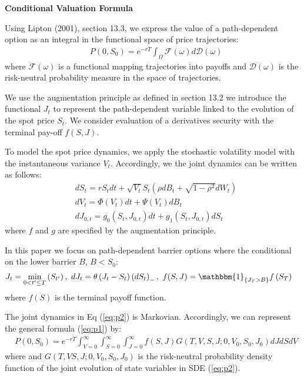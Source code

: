 \documentclass[pdftex,11pt,a4paper] {article}
\begin{document}
\textbf{Conditional Valuation Formula}




Using Lipton (2001), section 13.3, we express the value of a path-dependent option as an integral in the functional space of price trajectories:
\begin{equation} \label {eq:p1}
\begin{split}
& P(0, S_{0}) = e^{-rT} \int_{\Omega}\mathcal{F}(\omega)d\mathcal{D}(\omega)
\end{split}
\end{equation}
where $\mathcal{F}(\omega)$ is a functional mapping trajectories into payoffs and $\mathcal{D}(\omega)$ is the risk-neutral probability measure in the space of trajectories.

We use the augmentation principle as defined in section 13.2 we introduce the functional $J_{t}$  to represent the path-dependent variable linked to the evolution of the spot price $S_{t}$. We consider evaluation of a derivatives security with the terminal pay-off $f(S,J)$.


To model the spot price dynamics, we apply the stochastic volatility model with the instantaneous variance $V_{t}$. Accordingly, we the joint dynamics can be written as follows:
\begin{equation} \label {eq:p2}
\begin{split}
& dS_{t} = rS_{t}dt + \sqrt{V_{t}} S_{t}  \left(\rho dB_{t} + \sqrt{1-\rho^{2}}dW_{t}\right)\\
& dV_{t} = \Phi(V_{t})dt + \Psi(V_{t})dB_{t} \\
& dJ_{0,t} = g_{0}(S_{t}, J_{0,t})dt + g_{1}(S_{t}, J_{0,t})dS_{t}
\end{split}
\end{equation}
where $f$ and $g$ are specified by the augmentation principle.

In this paper we focus on path-dependent barrier options where the conditional on  the lower barrier $B$, $B<S_{0}$:
\begin{equation} \label {eq:p3}
\begin{split}
& J_{t} = \min_{0<t'\leq T} \left( S_{t'} \right), \ dJ_{t} =  \theta \left(J_{t}-S_{t}\right) \left(dS_{t}\right)_{-}, \ f(S,J) = \mathbbm{1}_{ \{ J_{T}> B  \}}f\left(S_{T}\right)
\end{split}
\end{equation}
where $f(S)$ is the terminal payoff function.

The joint dynamics in Eq (\ref{eq:p2}) is Markovian. Accordingly, we can represent the general formula (\ref{eq:p1}) by:
\begin{equation} \label {eq:p4}
\begin{split}
& P(0, S_{0}) = e^{-rT} \int^{\infty}_{V=0}\int^{\infty}_{S=0}\int^{\infty}_{J=0}f(S,J)G(T,V, S,J; 0, V_{0},S_{0}, J_{0})dJdSdV
\end{split}
\end{equation}
where  and $G(T, V S,J; 0, V_{0}, S_{0}, J_{0}) $ is the risk-neutral probability density function of the joint evolution of state variables in SDE (\ref{eq:p2}).
\end{document}
